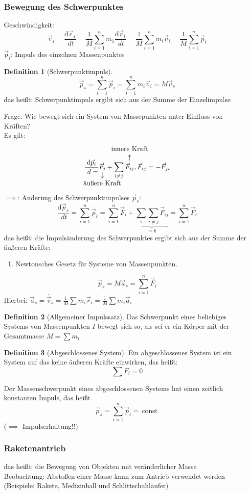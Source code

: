 \documentclass[a4paper]{scrartcl}
\renewcommand{\d}{\mathrm{d}}
\renewcommand{\v}[1]{\vec{#1}}
\newcommand{\dd}[2]{\frac{\d #1}{\ d#2}}
\theoremstyle{definition}
\newtheorem{defn}{Definition}
\theoremstyle{plain}
\theoremstyle{plain}
\theoremstyle{remark}
\theoremstyle{remark}
\theoremstyle{remark}
\begin{document}
\subsubsection{Bewegung des Schwerpunktes}
\label{sec-6-1-1}
Geschwindigkeit:
\[\v v_s = \dd{\v r_s}{t} = \frac{1}{M} \sum_{i = 1}^n m_1 \dd{\v r_i}{t} = \frac{1}{M} \sum_{i = 1}^n m_i \v v_i = \frac{1}{M}\sum_{i = 1}^n \v p_i\]
$\v p_i$: Impuls des einzelnen Massenpunktes
\begin{defn}[Schwerpunktimpuls]
\[\v p_s = \sum_{i = 1}^{n}\v p_i = \sum_{i = 1}^{n} m_i \v v_i = M \v v_s\]
das heißt: Schwerpunktimpuls ergibt sich aus der Summe der Einzelimpulse
\end{defn}
Frage: Wie bewegt sich ein System von Massepunkten unter Einfluss von Kräften? \\
        Es gilt:
\[\dd{\v p_i} = \underarrow[\v F_i]{äußere Kraft} + \sum_{i\neq j}^{}\overarrow[\v F_{i j}]{innere Kraft}, \v F_{ij} = - \v F_{j i}\]
$\implies$: Änderung des Schwerpunktimpulses $\v p_s$:
\[ \dd{\v p_s}{t} = \sum_{i = 1}^{n}\dot{\v p_i} = \sum_{i = 1}^{n}\v F_i + \underbrace{ \sum_{i} \sum_{i\neq j} \v F_{ij}}_{= 0} = \sum_{i = 1}^{n} \v F_i\]
das heißt: die Impulsänderung des Schwerpunktes ergibt sich aus der Summe der äußeren Kräfte:
\begin{enumerate}
\item Newtonsches Gesetz für Systeme von Massenpunkten.
\end{enumerate}
\[\dot{\v p_s} = M \v a_s = \sum_{i = 1}^{n}\v F_i\]
Hierbei: $\v a_s = \dot{\v v_s} = \frac{1}{M} \sum m_i \ddot{\v r_i} = \frac{1}{M} \sum m_i \v a_i$

\begin{defn}[Allgemeiner Impulssatz]
Das Schwerpunkt eines beliebiges Systems von Massenpunkten $I$ bewegt sich so, als sei er ein Körper mit der Gesamtmasse $M = \sum m_i$
\end{defn}
\begin{defn}[Abgeschlossenes System]
Ein abgeschlossenes System ist ein System auf das keine äußeren Kräfte einwirken, das heißt:
\[\sum F_i = 0\]
\end{defn}

Der Massenschwerpunkt eines abgeschlossenen Systems hat einen zeitlich konstanten Impuls, das heißt
\[\v p_s = \sum_{i = 1}^{n} \v p_i =~\text{const}~\]
($\implies$ Impulserhaltung!!)
\subsubsection{Raketenantrieb}
\label{sec-6-1-2}
das heißt: die Bewegung von Objekten mit veränderlicher Masse \\
        Beobachtung: Abstoßen einer Masse kann zum Antrieb verwendet werden (Beispiele: Rakete, Medizinball und Schlittschuhläufer)
\end{document}
